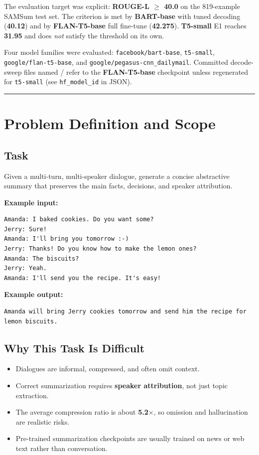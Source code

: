 \documentclass[11pt,a4paper]{article}
\newcommand{\sectionrule}{\vspace{6pt}\hrule\vspace{10pt}}
\newcommand{\tightitem}{\setlength\itemsep{2pt}\setlength\parskip{0pt}}
\begin{document}
The evaluation target was explicit: \textbf{ROUGE-L $\geq$ 40.0} on the 819-example SAMSum test set. The criterion is met by \textbf{BART-base} with tuned decoding (\textbf{40.12}) and by \textbf{FLAN-T5-base} full fine-tune (\textbf{42.275}). \textbf{T5-small} E1 reaches \textbf{31.95} and does \emph{not} satisfy the threshold on its own.

Four model families were evaluated: \texttt{facebook/bart-base}, \texttt{t5-small}, \texttt{google/flan-t5-base}, and \texttt{google/pegasus-cnn\_dailymail}. Committed decode-sweep files named  /  refer to the \textbf{FLAN-T5-base} checkpoint unless regenerated for \texttt{t5-small} (see \texttt{hf\_model\_id} in JSON).

\sectionrule

\section{Problem Definition and Scope}

\subsection{Task}

Given a multi-turn, multi-speaker dialogue, generate a concise abstractive summary that preserves the main facts, decisions, and speaker attribution.

\textbf{Example input:}
\begin{lstlisting}
Amanda: I baked cookies. Do you want some?
Jerry: Sure!
Amanda: I'll bring you tomorrow :-)
Jerry: Thanks! Do you know how to make the lemon ones?
Amanda: The biscuits?
Jerry: Yeah.
Amanda: I'll send you the recipe. It's easy!
\end{lstlisting}

\textbf{Example output:}
\begin{lstlisting}
Amanda will bring Jerry cookies tomorrow and send him the recipe for lemon biscuits.
\end{lstlisting}

\subsection{Why This Task Is Difficult}

\begin{itemize}\tightitem
\item Dialogues are informal, compressed, and often omit context.
\item Correct summarization requires \textbf{speaker attribution}, not just topic extraction.
\item The average compression ratio is about \textbf{5.2$\times$}, so omission and hallucination are realistic risks.
\item Pre-trained summarization checkpoints are usually trained on news or web text rather than conversation.
\end{itemize}
\end{document}
